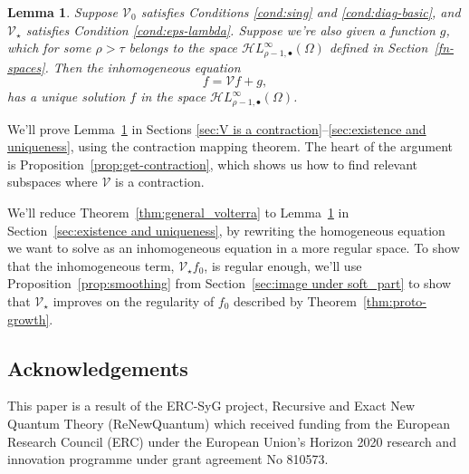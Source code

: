 \documentclass{article}
\theoremstyle{plain}
\newtheorem{lemma}{Lemma}
\newcommand{\singexp}[2]{\mathcal{H}L^\infty_{#1, #2}}
\newcommand{\singexpalg}[1]{\singexp{#1}{\bullet}}
\newcommand{\volterra}{\mathcal{V}}
\newcommand{\hardpart}{\mathcal{V}_0}
\newcommand{\softpart}{\mathcal{V}_\star}
\begin{document}
\begin{lemma}\label{lem:perturbed_volterra}
Suppose $\hardpart$ satisfies {\em Conditions \eqref{cond:sing}} and \eqref{cond:diag-basic}, and $\softpart$ satisfies {\em Condition \eqref{cond:eps-lambda}}. Suppose we're also given a function $g$, which for some $\rho > \tau$ belongs to the space $\singexpalg{\rho-1}(\Omega)$ defined in Section~\ref{fn-spaces}. Then the inhomogeneous equation
\[ f = \volterra f + g, \]
has a unique solution $f$ in the space $\singexpalg{\rho-1}(\Omega)$.
\end{lemma}
We'll prove Lemma~\ref{lem:perturbed_volterra} in Sections \ref{sec:V is a contraction}--\ref{sec:existence and uniqueness}, using the contraction mapping theorem. The heart of the argument is Proposition~\ref{prop:get-contraction}, which shows us how to find relevant subspaces where $\volterra$ is a contraction.

We'll reduce Theorem~\ref{thm:general_volterra} to Lemma~\ref{lem:perturbed_volterra} in Section~\ref{sec:existence and uniqueness}, by rewriting the homogeneous equation we want to solve as an inhomogeneous equation in a more regular space. To show that the inhomogeneous term, $\softpart f_0$, is regular enough, we'll use Proposition~\ref{prop:smoothing} from Section~\ref{sec:image under soft_part} to show that $\softpart$ improves on the regularity of $f_0$ described by Theorem~\ref{thm:proto-growth}.


\subsection{Acknowledgements}

This paper is a result of the ERC-SyG project, Recursive and Exact New Quantum Theory (ReNewQuantum) which received funding from the European Research Council (ERC) under the European Union's Horizon 2020 research and innovation programme under grant agreement No 810573. 
\end{document}
